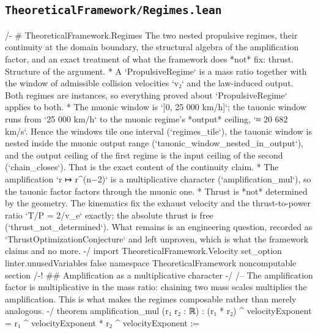 \documentclass[11pt,a4paper]{article}
\begin{document}
\subsection*{\texttt{TheoreticalFramework/Regimes.lean}}
\vspace{2pt}
{\ttfamily\scriptsize\setlength{\parindent}{0pt}\setlength{\baselineskip}{7.6pt}\setlength{\parskip}{0pt}\raggedright\obeyspaces\obeylines
/-
\# TheoreticalFramework.Regimes
\mbox{}
The two nested propulsive regimes, their continuity at the domain boundary, the
structural algebra of the amplification factor, and an exact treatment of what
the framework does *not* fix: thrust.
\mbox{}
Structure of the argument.
\mbox{}
* A `PropulsiveRegime` is a mass ratio together with the window of admissible
  collision velocities `v₂` and the law-induced output.  Both regimes are
  instances, so everything proved about `PropulsiveRegime` applies to both.
* The muonic window is `]0, 25 000 km/h]`; the tauonic window runs from
  `25 000 km/h` to the muonic regime's *output* ceiling, `≈ 20 682 km/s`.
  Hence the windows tile one interval (`regimes\_\allowbreak{}tile`), the tauonic window is
  nested inside the muonic output range (`tauonic\_\allowbreak{}window\_\allowbreak{}nested\_\allowbreak{}in\_\allowbreak{}output`), and
  the output ceiling of the first regime is the input ceiling of the second
  (`chain\_\allowbreak{}closes`).  That is the exact content of the continuity claim.
* The amplification `r ↦ r\textasciicircum{}(n−2)` is a multiplicative character
  (`amplification\_\allowbreak{}mul`), so the tauonic factor factors through the muonic one.
* Thrust is *not* determined by the geometry.  The kinematics fix the exhaust
  velocity and the thrust-to-power ratio `T/P = 2/v\_\allowbreak{}e` exactly; the absolute
  thrust is free (`thrust\_\allowbreak{}not\_\allowbreak{}determined`).  What remains is an engineering
  question, recorded as `ThrustOptimizationConjecture` and left unproven, which
  is what the framework claims and no more.
-/
import TheoreticalFramework.Velocity
\mbox{}
set\_\allowbreak{}option linter.unusedVariables false
\mbox{}
namespace TheoreticalFramework
\mbox{}
noncomputable section
\mbox{}
/-! \#\# Amplification as a multiplicative character -/
\mbox{}
/-- The amplification factor is multiplicative in the mass ratio: chaining two
mass scales multiplies the amplification.  This is what makes the regimes
composable rather than merely analogous. -/
theorem amplification\_\allowbreak{}mul (r₁ r₂ : ℝ) :
    (r₁ * r₂) \textasciicircum{} velocityExponent = r₁ \textasciicircum{} velocityExponent * r₂ \textasciicircum{} velocityExponent :=
}
\end{document}
